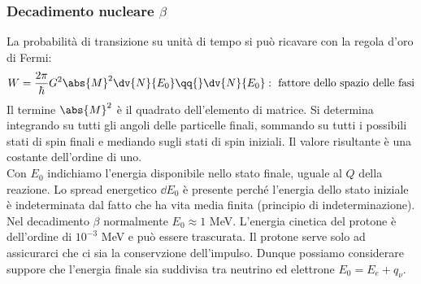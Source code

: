 \subsubsection{Decadimento nucleare $\beta$}
La probabilità di transizione su unità di tempo si può ricavare con la regola d'oro di Fermi:
\begin{equation*}
W=\frac{2\pi}{\hbar}G^2\abs{M}^2\dv{N}{E_0}\qq{}\dv{N}{E_0}:\textnormal{ fattore dello spazio delle fasi}
\end{equation*}
Il termine $\abs{M}^2$ è il quadrato dell'elemento di matrice. Si determina integrando su tutti gli angoli delle particelle finali, sommando su tutti i possibili stati di spin finali e mediando sugli stati di spin iniziali. Il valore risultante è una costante dell'ordine di uno.\\
Con $E_0$ indichiamo l'energia disponibile nello stato finale, uguale al $Q$ della reazione. Lo spread energetico $\dd{E_0}$ è presente perché l'energia dello stato iniziale è indeterminata dal fatto che ha vita media finita (principio di indeterminazione).\\
Nel decadimento $\beta$ normalmente $E_0\approx1$ MeV. L'energia cinetica del protone è dell'ordine di $10^{-3}$ MeV e può essere trascurata. Il protone serve solo ad assicurarci che ci sia la conservzione dell'impulso. Dunque possiamo considerare suppore che l'energia finale sia suddivisa tra neutrino ed elettrone $E_0=E_e+q_\nu$.
